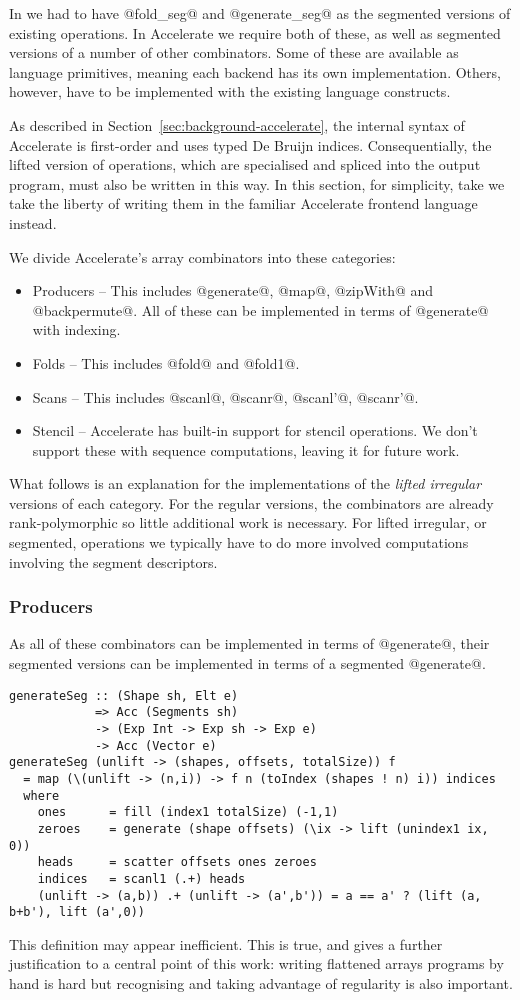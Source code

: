 In \ndp{} we had to have @fold_seg@ and @generate_seg@ as the segmented versions of existing operations. In Accelerate we require both of these, as well as segmented versions of a number of other combinators. Some of these are available as language primitives, meaning each backend has its own implementation. Others, however, have to be implemented with the existing language constructs.

As described in Section~\ref{sec:background-accelerate}, the internal syntax of Accelerate is first-order and uses typed De Bruijn indices. Consequentially, the lifted version of operations, which are specialised and spliced into the output program, must also be written in this way. In this section, for simplicity, take we take the liberty of writing them in the familiar Accelerate frontend language instead.

We divide Accelerate's array combinators into these categories:
%
\begin{itemize}
\item Producers -- This includes @generate@, @map@, @zipWith@ and @backpermute@. All of these can be implemented in terms of @generate@ with indexing.
\item Folds -- This includes @fold@ and @fold1@.
\item Scans -- This includes @scanl@, @scanr@, @scanl'@, @scanr'@.
\item Stencil -- Accelerate has built-in support for stencil operations. We don't support these with sequence computations, leaving it for future work.
\end{itemize}

What follows is an explanation for the implementations of the \emph{lifted irregular} versions of each category. For the regular versions, the combinators are already rank-polymorphic so little additional work is necessary. For lifted irregular, or segmented, operations we typically have to do more involved computations involving the segment descriptors.

\subsubsection{Producers}
As all of these combinators can be implemented in terms of @generate@, their segmented versions can be implemented in terms of a segmented @generate@.
%
\begin{lstlisting}
generateSeg :: (Shape sh, Elt e)
            => Acc (Segments sh)
            -> (Exp Int -> Exp sh -> Exp e)
            -> Acc (Vector e)
generateSeg (unlift -> (shapes, offsets, totalSize)) f
  = map (\(unlift -> (n,i)) -> f n (toIndex (shapes ! n) i)) indices
  where
    ones      = fill (index1 totalSize) (-1,1)
    zeroes    = generate (shape offsets) (\ix -> lift (unindex1 ix, 0))
    heads     = scatter offsets ones zeroes
    indices   = scanl1 (.+) heads
    (unlift -> (a,b)) .+ (unlift -> (a',b')) = a == a' ? (lift (a, b+b'), lift (a',0))
\end{lstlisting}
%
This definition may appear inefficient. This is true, and gives a further justification to a central point of this work: writing flattened arrays programs by hand is hard but recognising and taking advantage of regularity is also important.

